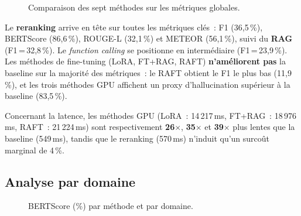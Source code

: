 \documentclass[10pt,journal,compsoc]{IEEEtran}
\newcommand{\bs}{BERTScore}
\newcommand{\rl}{ROUGE-L}
\newcommand{\met}{METEOR}
\begin{document}
\begin{figure}[H]
  \centering
  \caption{Comparaison des sept méthodes sur les métriques globales.}
  \label{fig:barres_globales}
\end{figure}

Le \textbf{reranking} arrive en tête sur toutes les métriques clés~:
F1 (36,5\,\%), \bs{} (86,6\,\%), \rl{} (32,1\,\%) et \met{}
(56,1\,\%), suivi du \textbf{RAG} (F1\,=\,32,8\,\%). Le
\textit{function calling} se positionne en intermédiaire (F1\,=\,23,9\,\%).
Les méthodes de fine-tuning (LoRA, FT+RAG, RAFT) \textbf{n'améliorent
pas} la baseline sur la majorité des métriques~: le RAFT obtient le
F1 le plus bas (11,9\,\%), et les trois méthodes GPU affichent un
proxy d'hallucination supérieur à la baseline (83,5\,\%).

Concernant la latence, les méthodes GPU (LoRA~: 14\,217\,ms,
FT+RAG~: 18\,976\,ms, RAFT~: 21\,224\,ms) sont respectivement
\textbf{26$\times$}, \textbf{35$\times$} et \textbf{39$\times$}
plus lentes que la baseline (549\,ms), tandis que le reranking (570\,ms)
n'induit qu'un surcoût marginal de 4\,\%.

\subsection{Analyse par domaine}
\label{subsec:domaine}

\begin{figure}[H]
  \centering
  \caption{BERTScore (\%) par méthode et par domaine.}
  \label{fig:heatmap}
\end{figure}
\end{document}

